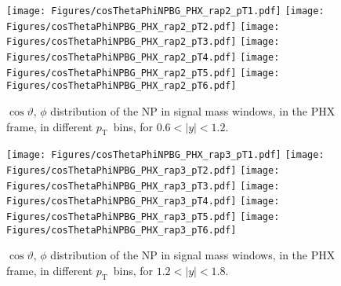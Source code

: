 \documentclass[12pt]{article}
\newcommand{\pt}{$p_{\mathrm{T}}$}
\begin{document}
\begin{figure}[htbp]
\centering
\texttt{[image: Figures/cosThetaPhiNPBG\_PHX\_rap2\_pT1.pdf]}
\texttt{[image: Figures/cosThetaPhiNPBG\_PHX\_rap2\_pT2.pdf]}
\texttt{[image: Figures/cosThetaPhiNPBG\_PHX\_rap2\_pT3.pdf]}
\texttt{[image: Figures/cosThetaPhiNPBG\_PHX\_rap2\_pT4.pdf]}
\texttt{[image: Figures/cosThetaPhiNPBG\_PHX\_rap2\_pT5.pdf]}
\texttt{[image: Figures/cosThetaPhiNPBG\_PHX\_rap2\_pT6.pdf]}
\caption{$\cos\vartheta,\,\phi$ distribution of the NP in signal mass windows, 
	in the PHX frame, in different \pt\ bins, for $0.6 < |y| < 1.2$.}
\end{figure}
\clearpage

\begin{figure}[htbp]
\centering
\texttt{[image: Figures/cosThetaPhiNPBG\_PHX\_rap3\_pT1.pdf]}
\texttt{[image: Figures/cosThetaPhiNPBG\_PHX\_rap3\_pT2.pdf]}
\texttt{[image: Figures/cosThetaPhiNPBG\_PHX\_rap3\_pT3.pdf]}
\texttt{[image: Figures/cosThetaPhiNPBG\_PHX\_rap3\_pT4.pdf]}
\texttt{[image: Figures/cosThetaPhiNPBG\_PHX\_rap3\_pT5.pdf]}
\texttt{[image: Figures/cosThetaPhiNPBG\_PHX\_rap3\_pT6.pdf]}
\caption{$\cos\vartheta,\,\phi$ distribution of the NP in signal mass windows, 
	in the PHX frame, in different \pt\ bins, for $1.2 < |y| < 1.8$.}
\end{figure}
\clearpage
\end{document}

